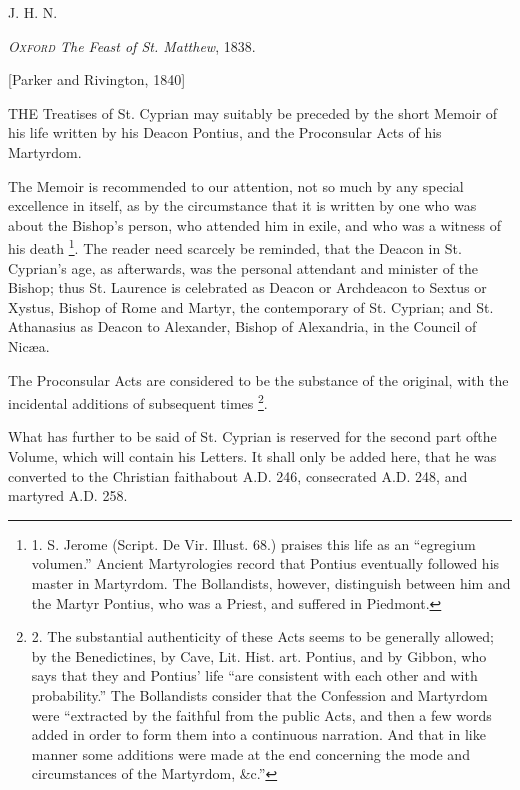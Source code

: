 J. H. N.

\emph{O\textsc{xford} The Feast of St. Matthew}, 1838.



[Parker and Rivington, 1840]


THE
Treatises of St. Cyprian may suitably be preceded by the short Memoir
of his life written by his Deacon Pontius, and the Proconsular Acts of
his Martyrdom.

The Memoir is recommended to
our attention, not so much by any special excellence in itself, as by
the circumstance that it is written by one who was about the Bishop's
person, who attended him in exile, and who was a witness of his death
\footnote{1. S. Jerome (Script. De Vir.
Illust. 68.) praises this life as an ``egregium volumen.'' Ancient
Martyrologies record that Pontius eventually followed his master in
Martyrdom. The Bollandists, however, distinguish between him and the
Martyr Pontius, who was a Priest, and suffered in Piedmont.}. The reader need scarcely
be reminded, that the Deacon in St. Cyprian's age, as afterwards, was
the personal attendant and minister of the Bishop; thus St. Laurence
is celebrated as Deacon or Archdeacon to Sextus or Xystus, Bishop of
Rome and Martyr, the contemporary of St. Cyprian; and St. Athanasius
as Deacon to Alexander, Bishop of Alexandria, in the Council of Nicæa.

The Proconsular Acts are
considered to be the substance of the original, with the incidental
additions of subsequent times \footnote{2. The
substantial authenticity of these Acts seems to be generally allowed;
by the Benedictines, by Cave, Lit. Hist. art. Pontius, and by Gibbon,
who says that they and Pontius' life ``are consistent with each other
and with probability.'' The Bollandists consider that the Confession
and Martyrdom were ``extracted by the faithful from the public Acts,
and then a few words added in order to form them into a continuous
narration. And that in like manner some additions were made at the end
concerning the mode and circumstances of the Martyrdom, \&c.''}.

What has further to be said of
St. Cyprian is reserved for the second part of\emph{}the Volume,
which will contain his Letters. It shall only be added here, that he
was converted to the Christian faith\emph{}about A.D. 246, consecrated A.D.
248, and martyred A.D. 258.

